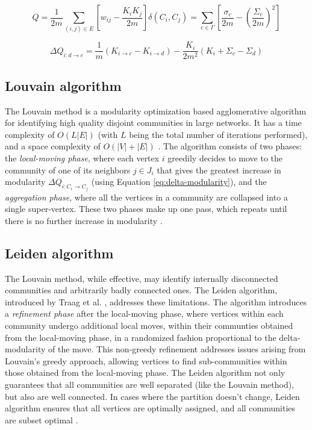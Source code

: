 \begin{equation}
\label{eq:modularity}
  Q
  = \frac{1}{2m} \sum_{(i, j) \in E} \left[w_{ij} - \frac{K_i K_j}{2m}\right] \delta(C_i, C_j)
  = \sum_{c \in \Gamma} \left[\frac{\sigma_c}{2m} - \left(\frac{\Sigma_c}{2m}\right)^2\right]
\end{equation}

\begin{equation}
\label{eq:delta-modularity}
  \Delta Q_{i: d \rightarrow c}
  = \frac{1}{m} (K_{i \rightarrow c} - K_{i \rightarrow d}) - \frac{K_i}{2m^2} (K_i + \Sigma_c - \Sigma_d)
\end{equation}




\subsection{Louvain algorithm}
\label{sec:about-louvain}

The Louvain method \cite{com-blondel08} is a modularity optimization based agglomerative algorithm for identifying high quality disjoint communities in large networks. It has a time complexity of $O (L |E|)$ (with $L$ being the total number of iterations performed), and a space complexity of $O(|V| + |E|)$ \cite{com-lancichinetti09}. The algorithm consists of two phases: the \textit{local-moving phase}, where each vertex $i$ greedily decides to move to the community of one of its neighbors $j \in J_i$ that gives the greatest increase in modularity $\Delta Q_{i:C_i \rightarrow C_j}$ (using Equation \ref{eq:delta-modularity}), and the \textit{aggregation phase}, where all the vertices in a community are collapsed into a single super-vertex. These two phases make up one pass, which repeats until there is no further increase in modularity \cite{com-blondel08, com-leskovec21}.




\subsection{Leiden algorithm}
\label{sec:about-leiden}

The Louvain method, while effective, may identify internally disconnected communities and arbitrarily badly connected ones. The Leiden algorithm, introduced by Traag et al. \cite{com-traag19}, addresses these limitations. The algorithm introduces a \textit{refinement phase} after the local-moving phase, where vertices within each community undergo additional local moves, within their communties obtained from the local-moving phase, in a randomized fashion proportional to the delta-modularity of the move. This non-greedy refinement addresses issues arising from Louvain's greedy approach, allowing vertices to find sub-communities within those obtained from the local-moving phase. The Leiden algorithm not only guarantees that all communities are well separated (like the Louvain method), but also are well connected. In cases where the partition doesn't change, Leiden algorithm ensures that all vertices are optimally assigned, and all communities are subset optimal \cite{com-traag19}.
